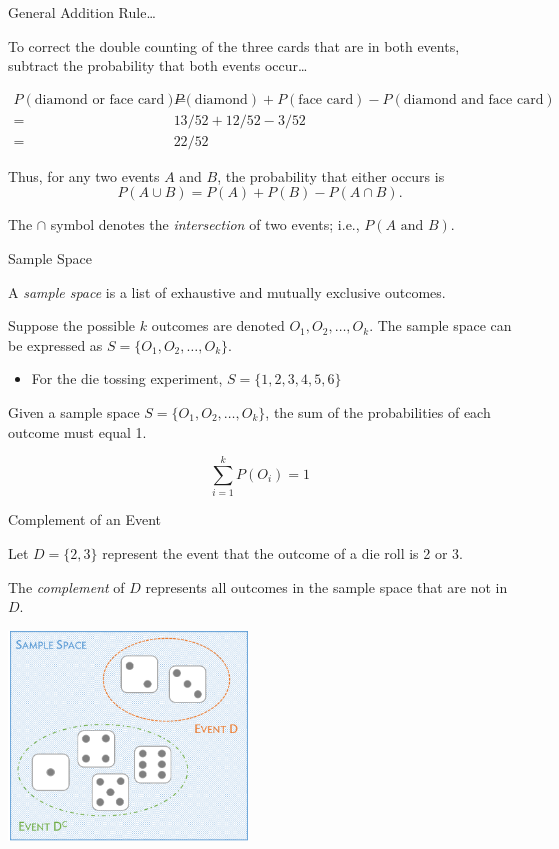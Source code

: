 \documentclass[ignorenonframetext,aspectratio=169]{beamer}
\providecommand{\tightlist}{%
  \setlength{\itemsep}{0pt}\setlength{\parskip}{0pt}}
\begin{document}
\begin{frame}{General Addition Rule\ldots{}}

To correct the double counting of the three cards that are in both
events, subtract the probability that both events occur\ldots{}

\begin{align*}
P(\text{diamond or face card}) =& P(\text{diamond}) + P(\text{face card}) - P(\text{diamond and face card}) \\
=& 13/52 + 12/52 - 3/52 \\
=& 22/52
\end{align*}

Thus, for any two events \(A\) and \(B\), the probability that either
occurs is \[P(A \cup B) = P(A) + P(B) - P(A \cap B).\]

The \(\cap\) symbol denotes the \emph{intersection} of two events; i.e.,
\(P(A \text{ and }B)\).

\end{frame}

\begin{frame}{Sample Space}

A \emph{sample space} is a list of exhaustive and mutually exclusive
outcomes.

Suppose the possible \(k\) outcomes are denoted
\(O_1, O_2, \dots, O_k\). The sample space can be expressed as
\(S = \{O_1, O_2, \dots, O_k\}\).

\begin{itemize}
\tightlist
\item
  For the die tossing experiment, \(S = \{1, 2, 3, 4, 5, 6\}\)
\end{itemize}

Given a sample space \(S = \{O_1, O_2, \dots, O_k\}\), the sum of the
probabilities of each outcome must equal 1.

\[\sum_{i=1}^{k}P(O_i)=1\]

\end{frame}

\begin{frame}{Complement of an Event}

Let \(D = \{2, 3\}\) represent the event that the outcome of a die roll
is 2 or 3.

The \emph{complement} of \(D\) represents all outcomes in the sample
space that are not in \(D\).

\begin{center}
\includegraphics[width=2.5in]{figures/complementOfD.png}
\end{center}

\end{frame}
\end{document}
